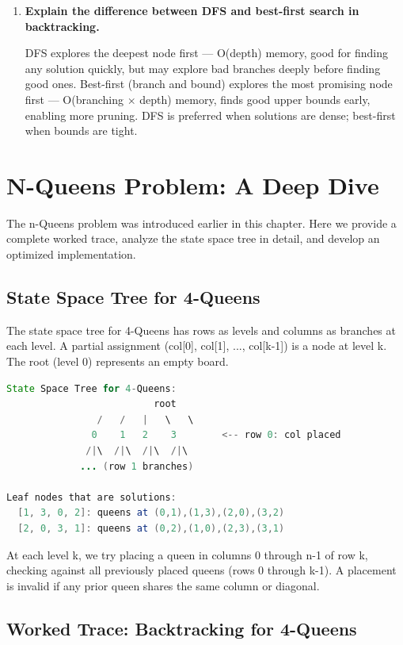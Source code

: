 \begin{enumerate}
\item \textbf{Explain the difference between DFS and best-first search in backtracking.}

DFS explores the deepest node first — O(depth) memory, good for finding any solution quickly, but may explore bad branches deeply before finding good ones. Best-first (branch and bound) explores the most promising node first — O(branching $\times$ depth) memory, finds good upper bounds early, enabling more pruning. DFS is preferred when solutions are dense; best-first when bounds are tight.
\end{enumerate}

\section{N-Queens Problem: A Deep Dive}\label{sec:nqueens-deep}

The n-Queens problem was introduced earlier in this chapter. Here we provide a complete worked trace, analyze the state space tree in detail, and develop an optimized implementation.

\subsection{State Space Tree for 4-Queens}

The state space tree for 4-Queens has rows as levels and columns as branches at each level. A partial assignment (col[0], col[1], ..., col[k-1]) is a node at level k. The root (level 0) represents an empty board.

\begin{lstlisting}[language=Java]
State Space Tree for 4-Queens:
                          root
                /   /   |   \   \
               0    1   2    3        <-- row 0: col placed
              /|\  /|\  /|\  /|\
             ... (row 1 branches)
             
Leaf nodes that are solutions:
  [1, 3, 0, 2]: queens at (0,1),(1,3),(2,0),(3,2)
  [2, 0, 3, 1]: queens at (0,2),(1,0),(2,3),(3,1)
\end{lstlisting}

At each level k, we try placing a queen in columns 0 through n-1 of row k, checking against all previously placed queens (rows 0 through k-1). A placement is invalid if any prior queen shares the same column or diagonal.

\subsection{Worked Trace: Backtracking for 4-Queens}

